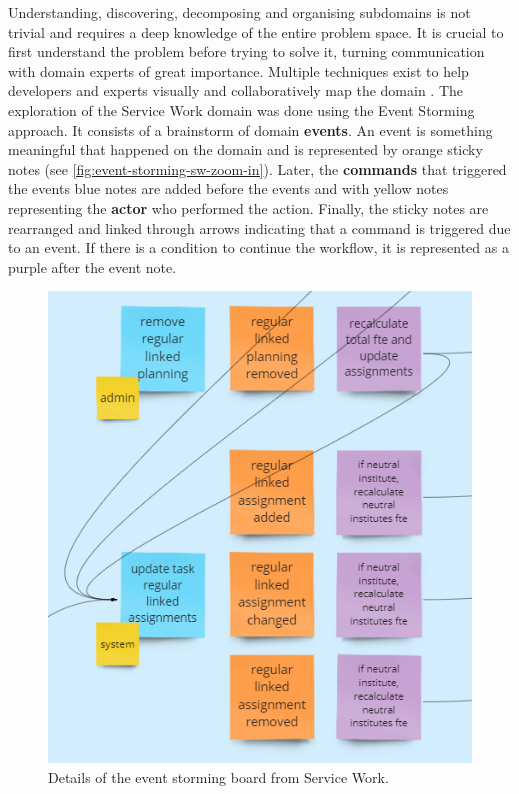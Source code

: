Understanding, discovering, decomposing and organising subdomains is not trivial and requires a deep knowledge of the entire problem space. It is crucial to first understand the problem before trying to solve it, turning communication with domain experts of great importance. Multiple techniques exist to help developers and experts visually and collaboratively map the domain \cite{ddd-modelling-process}. The exploration of the Service Work domain was done using the Event Storming \cite{event-storming-website} \cite{introducing-event-storming} approach. It consists of a brainstorm of domain \textbf{events}. An event is something meaningful that happened on the domain and is represented by orange sticky notes (see \autoref{fig:event-storming-sw-zoom-in}). Later, the \textbf{commands} that triggered the events blue notes are added before the events and with yellow notes representing the \textbf{actor} who performed the action. Finally, the sticky notes are rearranged and linked through arrows indicating that a command is triggered due to an event. If there is a condition to continue the workflow, it is represented as a purple after the event note.

\begin{figure}[htbp]
  \centering
  \includegraphics[scale=0.7]{Imagens/chap04/event-storming-sw-zoom-in.png}
  \caption{Details of the event storming board from Service Work.}
  \label{fig:event-storming-sw-zoom-in}
\end{figure}

